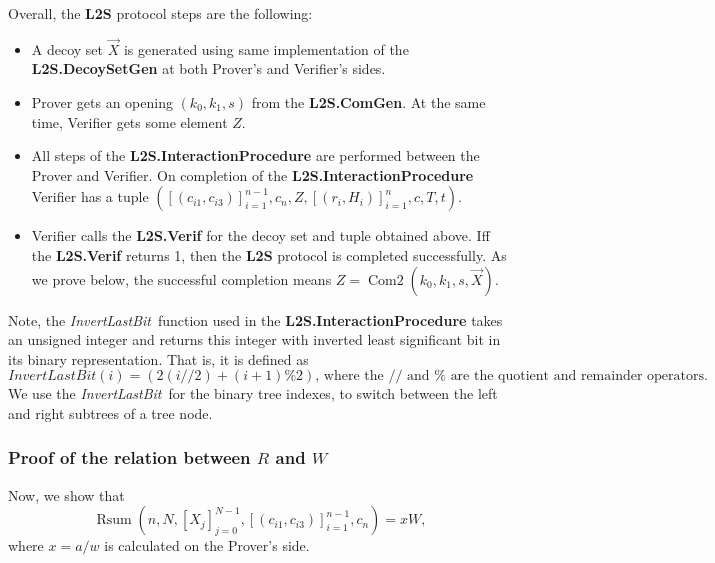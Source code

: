 \documentclass{mathcryptology} %
\DeclareMathOperator{\Rsum}{Rsum}
\DeclareMathOperator{\ComTwo}{Com2}
\newcommand{\InvertLastBit}{\textit{InvertLastBit}}
\theoremstyle{title}
\theoremstyle{titleof}
\begin{document}
    Overall, the \textbf{L2S} protocol steps are the following:
    \begin{itemize}
        \item A decoy set $\vec{X}$ is generated using same implementation of the \textbf{L2S.DecoySetGen} at both Prover's and Verifier's sides.
        \item Prover gets an opening $\left(k_{0}, k_{1}, s\right)$ from the \textbf{L2S.ComGen}. At the same time, Verifier gets some element $Z$.
        \item All steps of the \textbf{L2S.InteractionProcedure} are performed between the Prover and Verifier. On completion of the \textbf{L2S.InteractionProcedure} Verifier has a tuple $\left({\left[\left(c_{i1}, c_{i3}\right)\right]}_{i=1}^{n-1}, c_{n}, Z, {\left[\left(r_{i}, H_{i}\right)\right]}_{i=1}^n, c, T, t\right)$.
        \item Verifier calls the \textbf{L2S.Verif} for the decoy set and tuple obtained above. Iff the \textbf{L2S.Verif} returns 1, then the \textbf{L2S} protocol is completed successfully. As we prove below, the successful completion means $Z=\ComTwo\left(k_{0}, k_{1}, s, \vec{X}\right)$.
    \end{itemize}
    Note, the \InvertLastBit\ function used in the \textbf{L2S.InteractionProcedure} takes an unsigned integer and returns this integer with inverted least significant bit in its binary representation. That is, it is defined as
    \begin{equation*}{
        \InvertLastBit\left(i\right)=\left(2\left(i//2\right)+\left(i+1\right)\%2\right) \text{, where the $//$ and $\%$ are the quotient and remainder operators.}	
    }
    \end{equation*}
    We use the \InvertLastBit\ for the binary tree indexes, to switch between the left and right subtrees of a tree node.


\subsubsection{Proof of the relation between $R$ and $W$}\label{Sec:6.2.1.}
    Now, we show that
    \begin{equation*}{
        \Rsum\left(n, N, {\left[X_{j}\right]}_{j=0}^{N-1}, {\left[\left(c_{i1}, c_{i3}\right)\right]}_{i=1}^{n-1}, c_{n}\right)=xW,} 
    \end{equation*}
    where $x=a/w$ is calculated on the Prover's side.
    
\end{document}
